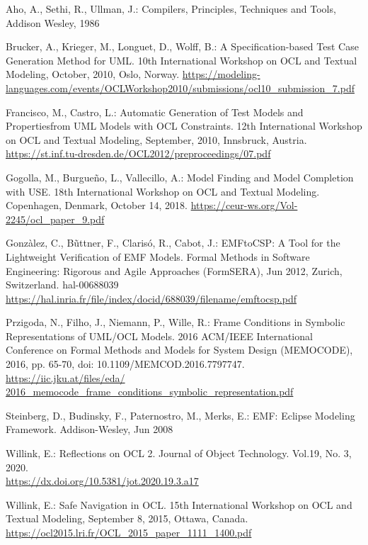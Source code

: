 \documentclass[
]{ceurart}
\begin{document}
%
%
\begin{thebibliography}{}

Aho, A., Sethi, R., Ullman, J.: Compilers, Principles, Techniques and Tools, Addison Wesley, 1986

Brucker, A., Krieger, M., Longuet, D., Wolff, B.: A Specification-based Test Case Generation Method for UML. 10th International Workshop on OCL and Textual Modeling, October, 2010, Oslo, Norway.
\url{https://modeling-languages.com/events/OCLWorkshop2010/submissions/ocl10\_submission\_7.pdf}

Francisco, M., Castro, L.: Automatic Generation of Test Models and Propertiesfrom UML Models with OCL Constraints. 12th International Workshop on OCL and Textual Modeling, September, 2010, Innsbruck, Austria.\\
\url{https://st.inf.tu-dresden.de/OCL2012/preproceedings/07.pdf}

Gogolla, M., Burgue\~no, L., Vallecillo, A.: Model Finding and Model Completion with USE. 18th International Workshop on OCL and Textual Modeling. Copenhagen, Denmark, October 14, 2018.
\url{https://ceur-ws.org/Vol-2245/ocl_paper_9.pdf}

Gonz\`alez, C., B\~uttner, F., Claris\'o, R., Cabot, J.: EMFtoCSP: A Tool for the Lightweight Verification of EMF Models. Formal Methods in Software Engineering: Rigorous and Agile Approaches (FormSERA), Jun 2012, Zurich, Switzerland. hal-00688039
\url{https://hal.inria.fr/file/index/docid/688039/filename/emftocsp.pdf}

Przigoda, N., Filho, J., Niemann, P., Wille, R.: Frame Conditions in Symbolic Representations of UML/OCL Models. 2016 ACM/IEEE International Conference on Formal Methods and Models for System Design (MEMOCODE), 2016, pp. 65-70, doi: 10.1109/MEMCOD.2016.7797747.\\
\url{https://iic.jku.at/files/eda/
2016\_memocode\_frame\_conditions\_symbolic\_representation.pdf}

Steinberg, D., Budinsky, F., Paternostro, M., Merks, E.: EMF: Eclipse Modeling Framework. Addison-Wesley, Jun 2008

Willink, E.: Reflections on OCL 2. Journal of Object Technology. Vol.19, No. 3, 2020.\\ \url{https://dx.doi.org/10.5381/jot.2020.19.3.a17}

Willink, E.: Safe Navigation in OCL.
15th International Workshop on OCL and Textual Modeling, September 8, 2015, Ottawa, Canada.\\
\url{https://ocl2015.lri.fr/OCL\_2015\_paper\_1111\_1400.pdf}


\end{thebibliography}
\end{document}
